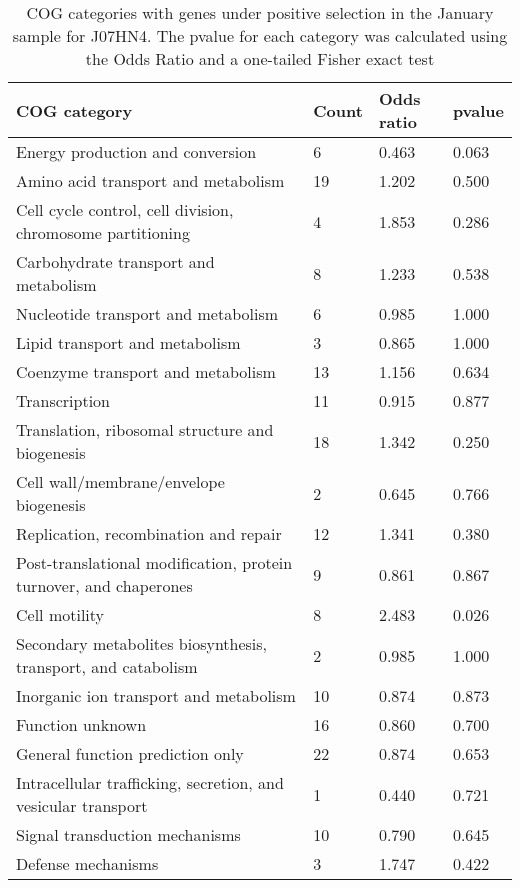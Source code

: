 \begin{table}[]
\footnotesize 
	\tabcolsep=0.11cm 
\caption{COG categories with genes under positive selection in the January sample for J07HN4. The pvalue for each category was calculated using the Odds Ratio and a one-tailed Fisher exact test} 
\begin{tabularx}{\textwidth}{L{6cm}R{2cm}R{2cm}R{2cm}} 
\hline 
\textbf{COG category} & \textbf{Count} & \textbf{Odds ratio} & \textbf{pvalue} \\ 
\hline 
Energy production and conversion & 6 & 0.463 & 0.063 \\ 
Amino acid transport and metabolism & 19 & 1.202 & 0.500 \\ 
Cell cycle control, cell division, chromosome partitioning & 4 & 1.853 & 0.286 \\ 
Carbohydrate transport and metabolism & 8 & 1.233 & 0.538 \\ 
Nucleotide transport and metabolism & 6 & 0.985 & 1.000 \\ 
Lipid transport and metabolism & 3 & 0.865 & 1.000 \\ 
Coenzyme transport and metabolism & 13 & 1.156 & 0.634 \\ 
Transcription & 11 & 0.915 & 0.877 \\ 
Translation, ribosomal structure and biogenesis & 18 & 1.342 & 0.250 \\ 
Cell wall/membrane/envelope biogenesis & 2 & 0.645 & 0.766 \\ 
Replication, recombination and repair & 12 & 1.341 & 0.380 \\ 
Post-translational modification, protein turnover, and chaperones & 9 & 0.861 & 0.867 \\ 
Cell motility & 8 & 2.483 & 0.026 \\ 
Secondary metabolites biosynthesis, transport, and catabolism & 2 & 0.985 & 1.000 \\ 
Inorganic ion transport and metabolism & 10 & 0.874 & 0.873 \\ 
Function unknown & 16 & 0.860 & 0.700 \\ 
General function prediction only & 22 & 0.874 & 0.653 \\ 
Intracellular trafficking, secretion, and vesicular transport & 1 & 0.440 & 0.721 \\ 
Signal transduction mechanisms & 10 & 0.790 & 0.645 \\ 
Defense mechanisms & 3 & 1.747 & 0.422 \\ 
\end{tabularx} 
\label{January_COG_Selection_J07HN4} 
 \end{table} 

